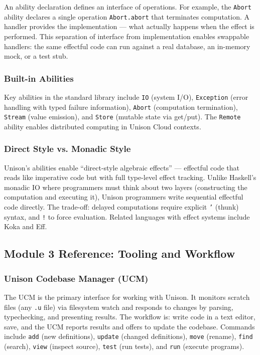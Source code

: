 \documentclass[11pt,letterpaper]{article}
\begin{document}
An ability declaration defines an interface of operations. For example, the \texttt{Abort} ability declares a single operation \texttt{Abort.abort} that terminates computation. A handler provides the implementation --- what actually happens when the effect is performed. This separation of interface from implementation enables swappable handlers: the same effectful code can run against a real database, an in-memory mock, or a test stub.

\subsubsection{Built-in Abilities}

Key abilities in the standard library include \texttt{IO} (system I/O), \texttt{Exception} (error handling with typed failure information), \texttt{Abort} (computation termination), \texttt{Stream} (value emission), and \texttt{Store} (mutable state via get/put). The \texttt{Remote} ability enables distributed computing in Unison Cloud contexts.

\subsubsection{Direct Style vs. Monadic Style}

Unison's abilities enable ``direct-style algebraic effects'' --- effectful code that reads like imperative code but with full type-level effect tracking. Unlike Haskell's monadic IO where programmers must think about two layers (constructing the computation and executing it), Unison programmers write sequential effectful code directly. The trade-off: delayed computations require explicit \texttt{'} (thunk) syntax, and \texttt{!} to force evaluation. Related languages with effect systems include Koka and Eff.

\subsection{Module 3 Reference: Tooling and Workflow}

\subsubsection{Unison Codebase Manager (UCM)}

The UCM is the primary interface for working with Unison. It monitors scratch files (any \texttt{.u} file) via filesystem watch and responds to changes by parsing, typechecking, and presenting results. The workflow is: write code in a text editor, save, and the UCM reports results and offers to update the codebase. Commands include \texttt{add} (new definitions), \texttt{update} (changed definitions), \texttt{move} (rename), \texttt{find} (search), \texttt{view} (inspect source), \texttt{test} (run tests), and \texttt{run} (execute programs).
\end{document}
